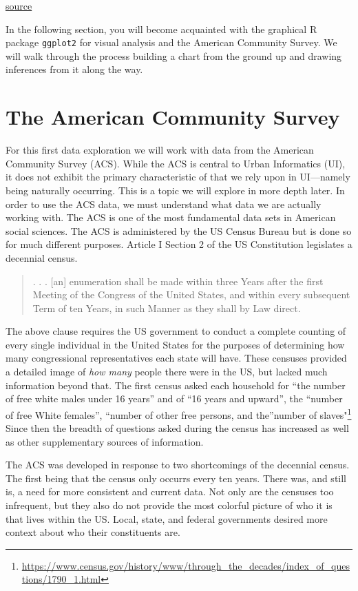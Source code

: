 \documentclass[
]{book}
\begin{document}
\href{}{source}

In the following section, you will become acquainted with the graphical R package \texttt{ggplot2} for visual analysis and the American Community Survey. We will walk through the process building a chart from the ground up and drawing inferences from it along the way.

\hypertarget{the-american-community-survey}{%
\section{The American Community Survey}\label{the-american-community-survey}}

For this first data exploration we will work with data from the American Community Survey (ACS). While the ACS is central to Urban Informatics (UI), it does not exhibit the primary characteristic of that we rely upon in UI---namely being naturally occurring. This is a topic we will explore in more depth later. In order to use the ACS data, we must understand what data we are actually working with. The ACS is one of the most fundamental data sets in American social sciences. The ACS is administered by the US Census Bureau but is done so for much different purposes. Article I Section 2 of the US Constitution legislates a decennial census.

\begin{quote}
. . . {[}an{]} enumeration shall be made within three Years after the first Meeting of the Congress of the United States, and within every subsequent Term of ten Years, in such Manner as they shall by Law direct.
\end{quote}

The above clause requires the US government to conduct a complete counting of every single individual in the United States for the purposes of determining how many congressional representatives each state will have. These censuses provided a detailed image of \emph{how many} people there were in the US, but lacked much information beyond that. The first census asked each household for ``the number of free white males under 16 years'' and of ``16 years and upward'', the ``number of free White females'', ``number of other free persons, and the''number of slaves"\footnote{\url{https://www.census.gov/history/www/through_the_decades/index_of_questions/1790_1.html}} Since then the breadth of questions asked during the census has increased as well as other supplementary sources of information.

The ACS was developed in response to two shortcomings of the decennial census. The first being that the census only occurrs every ten years. There was, and still is, a need for more consistent and current data. Not only are the censuses too infrequent, but they also do not provide the most colorful picture of who it is that lives within the US. Local, state, and federal governments desired more context about who their constituents are.
\end{document}
